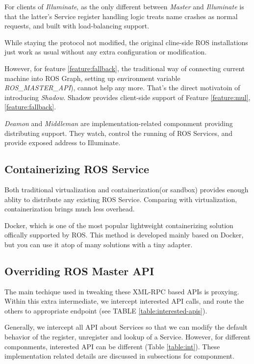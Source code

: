 For clients of \emph{Illuminate}, as the only different between \emph{Master} and \emph{Illuminate}
is that the latter's Service register handling logic treats name crashes as normal requests, 
and built with load-balancing support.

While staying the protocol not modified, the original cline-side ROS
installations just work as usual without any extra configuration or modification.

However, for feature \ref{feature:fallback}, the traditional way of connecting current machine into ROS Graph,
setting up environment variable \emph{ROS\_MASTER\_API}), cannot help any more.
That's the direct motivatoin of introducing \emph{Shadow}.
Shadow provides client-side support of Feature \ref{feature:mul}, \ref{feature:fallback}. 

\emph{Deamon} and \emph{Middleman} are implementation-related componment providing distributing support.
They watch, control the running of ROS Services, and provide exposed address to Illuminate.

\subsection{Containerizing ROS Service}
Both traditional virtualization and containerization(or sandbox) provides enough ablity to distribute any existing ROS Service.
Comparing with virtualization, containerization brings much less overhead.

Docker, which is one of the most popular lightweight containerizing solution offically supported by ROS.
This method is developed mainly based on Docker, but you can use it atop of many solutions with a tiny adapter. 

\subsection{Overriding ROS Master API}
The main techique used in tweaking these XML-RPC based APIs is proxying.
Within this extra intermediate, we intercept interested API calls,
and route the others to appropriate endpoint (see TABLE \ref{table:interested-apis}).

Generally, we intercept all API about Services so that we can modify the default behavior of the register,
unregister and lookup of a Service.
However, for different componments, interested API can be different (Table \ref{table:int}).
These implementation related details are discussed in subsections for componment.
 
